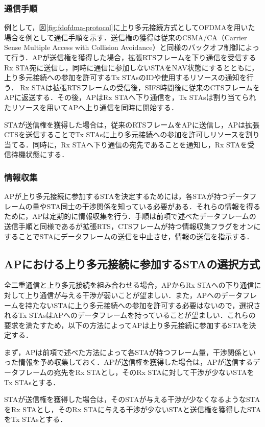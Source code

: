 \documentclass[technicalreport]{ieicej}
\begin{document}
		\subsubsection{通信手順}
		例として，図\ref{fig:fdofdma-protocol}に上り多元接続方式としてOFDMAを用いた場合を例として通信手順を示す．送信権の獲得は従来のCSMA/CA（Carrier Sense Multiple Access with Collision Avoidance）と同様のバックオフ制御によって行う．APが送信権を獲得した場合，拡張RTSフレームを下り通信を受信するRx STA宛に送信し，同時に通信に参加しないSTAをNAV状態にするとともに，上り多元接続への参加を許可するTx STAsのIDや使用するリソースの通知を行う．
		Rx STAは拡張RTSフレームの受信後，SIFS時間後に従来のCTSフレームをAPに返送する．その後，APはRx STAへ下り通信を，Tx STAsは割り当てられたリソースを用いてAPへ上り通信を同時に開始する．
		\par
		STAが送信権を獲得した場合は，従来のRTSフレームをAPに送信し，APは拡張CTSを送信することでTx STAsに上り多元接続への参加を許可しリソースを割り当てる．同時に，Rx STAへ下り通信の宛先であることを通知し，Rx STAを受信待機状態にする．
		\subsubsection{情報収集}
		APが上り多元接続に参加するSTAを決定するためには，各STAが持つデータフレームの量やSTA同士の干渉関係を知っている必要がある．それらの情報を得るために，APは定期的に情報収集を行う．手順は前項で述べたデータフレームの送信手順と同様であるが拡張RTS，CTSフレームが持つ情報収集フラグをオンにすることでSTAにデータフレームの送信を中止させ，情報の送信を指示する．
		\subsection{APにおける上り多元接続に参加するSTAの選択方式}
		全二重通信と上り多元接続を組み合わせる場合，APからRx STAへの下り通信に対して上り通信が与える干渉が弱いことが望ましい．また，APへのデータフレームを持たないSTAに上り多元接続への参加を許可する必要はないので，選択されるTx STAsはAPへのデータフレームを持っていることが望ましい．これらの要求を満たすため，以下の方法によってAPは上り多元接続に参加するSTAを決定する．
		\par
		まず，APは前項で述べた方法によって各STAが持つフレーム量，干渉関係といった情報を予め収集しておく．APが送信権を獲得した場合は，APが送信するデータフレームの宛先をRx STAとし，そのRx STAに対して干渉が少ないSTAをTx STAsとする．
		\par
		STAが送信権を獲得した場合は，そのSTAが与える干渉が少なくなるようなSTAをRx STAとし，そのRx STAに与える干渉が少ないSTAと送信権を獲得したSTAをTx STAsとする．
\end{document}
